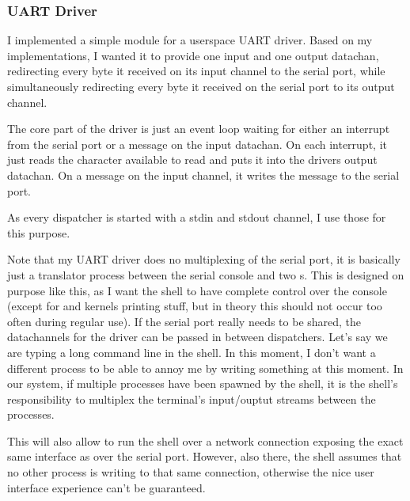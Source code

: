 \subsubsection{UART Driver}

I implemented a simple module for a userspace UART driver. Based on my  implementations, I wanted
it to provide one input and one output datachan, redirecting every byte it received on its input channel
to the serial port, while simultaneously redirecting every byte it received on the serial port to its output channel.

The core part of the driver is just an event loop waiting for either an interrupt
from the serial port or a message on the input datachan. On each interrupt,
it just reads the character available to read and puts it into the drivers output datachan.
On a message on the input channel, it writes the message to the serial port.

As every dispatcher is started with a stdin and stdout channel, I use those for this purpose.

Note that my UART driver does no multiplexing of the serial port, it is basically just a translator process
between the serial console and two s. This is designed on purpose like this, as I want the
shell to have complete control over the console (except for  and kernels printing stuff, but in theory
this should not occur too often during regular use). If the serial port really needs to be shared, the datachannels for the driver can be passed in between dispatchers.
Let's say we are typing a long command line in the shell. In this moment, I don't want
a different process to be able to annoy me by writing something at this moment.
In our system, if multiple processes have been spawned by the shell, it is the shell's
responsibility to multiplex the terminal's input/ouptut streams between the processes.

This will also allow to run the shell over a network connection exposing the exact same interface as over the
serial port. However, also there, the shell assumes that no other process is
writing to that same connection, otherwise the nice user interface experience
can't be guaranteed.


